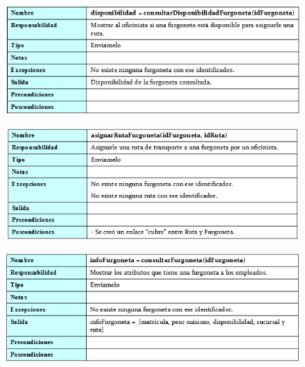 \begin{figure}[H]
	\centering
	\includegraphics[width=16cm]{5}
\end{figure}
\begin{figure}[H]
	\centering
	\includegraphics[width=16cm]{6}
\end{figure}
\begin{figure}[H]
	\centering
	\includegraphics[width=16cm]{7}
\end{figure}
\newpage
